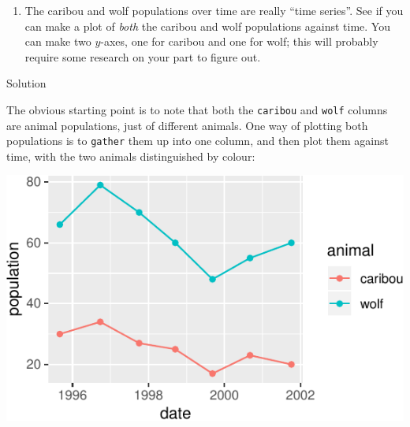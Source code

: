 \documentclass[]{tufte-book}
\newenvironment{Shaded}{}{}
\newcommand{\DataTypeTok}[1]{\textcolor[rgb]{0.56,0.13,0.00}{#1}}
\newcommand{\KeywordTok}[1]{\textcolor[rgb]{0.00,0.44,0.13}{\textbf{#1}}}
\newcommand{\NormalTok}[1]{#1}
\newcommand{\OperatorTok}[1]{\textcolor[rgb]{0.40,0.40,0.40}{#1}}
\newcommand{\StringTok}[1]{\textcolor[rgb]{0.25,0.44,0.63}{#1}}
\providecommand{\tightlist}{%
  \setlength{\itemsep}{0pt}\setlength{\parskip}{0pt}}
\theoremstyle{definition}
\theoremstyle{definition}
\theoremstyle{definition}
\theoremstyle{remark}
\begin{document}
\begin{enumerate}
\def\labelenumi{(\alph{enumi})}
\setcounter{enumi}{6}
\tightlist
\item
  The caribou and wolf populations over time are really ``time series''.
  See if you can make a plot of \emph{both} the caribou and wolf
  populations against time. You can make two \(y\)-axes, one for caribou
  and one for wolf; this will probably require some research on your
  part to figure out.
\end{enumerate}

Solution

The obvious starting point is to note that both the \texttt{caribou} and
\texttt{wolf} columns are animal populations, just of different animals.
One way of plotting both populations is to \texttt{gather} them up into
one column, and then plot them against time, with the two animals
distinguished by colour:

\begin{Shaded}
\end{Shaded}

\includegraphics{13-dates-and-times_files/figure-latex/unnamed-chunk-36-1}
\end{document}

